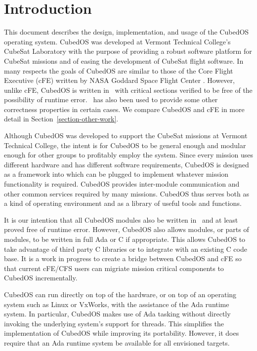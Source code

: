 \chapter{Introduction}
\label{chapt:introduction}

This document describes the design, implementation, and usage of the CubedOS operating system.
CubedOS was developed at Vermont Technical College's CubeSat Laboratory with the purpose of
providing a robust software platform for CubeSat missions and of easing the development of
CubeSat flight software. In many respects the goals of CubedOS are similar to those of the Core
Flight Executive (cFE) written by NASA Goddard Space Flight Center \cite{cFE}. However, unlike
cFE, CubedOS is written in \SPARK\ with critical sections verified to be free of the possibility
of runtime error. \SPARK\ has also been used to provide some other correctness properties in
certain cases. We compare CubedOS and cFE in more detail in Section~\ref{section-other-work}.

Although CubedOS was developed to support the CubeSat missions at Vermont Technical College, the
intent is for CubedOS to be general enough and modular enough for other groups to profitably
employ the system. Since every mission uses different hardware and has different software
requirements, CubedOS is designed as a framework into which  can be plugged to
implement whatever mission functionality is required. CubedOS provides inter-module
communication and other common services required by many missions. CubedOS thus serves both as a
kind of operating environment and as a library of useful tools and functions.

It is our intention that all CubedOS modules also be written in \SPARK\ and at least proved free
of runtime error. However, CubedOS also allows modules, or parts of modules, to be written in
full Ada or C if appropriate. This allows CubedOS to take advantage of third party C libraries
or to integrate with an existing C code base. It is a work in progress to create a bridge
between CubedOS and cFE so that current cFE/CFS users can migriate mission critical components
to CubedOS incrementally.

CubedOS can run directly on top of the hardware, or on top of an operating system such as Linux
or VxWorks, with the assistance of the Ada runtime system. In particular, CubedOS makes use of
Ada tasking without directly invoking the underlying system's support for threads. This
simplifies the implementation of CubedOS while improving its portability. However, it does
require that an Ada runtime system be available for all envisioned targets.

